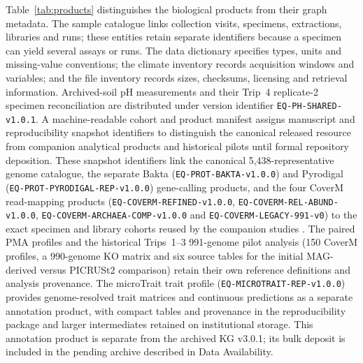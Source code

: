 \begin{revision}
Table~\ref{tab:products} distinguishes the biological products from their graph metadata.
The sample catalogue links collection visits, specimens, extractions, libraries and runs;
these entities retain separate identifiers because a specimen can yield several assays or runs.
The data dictionary specifies types, units and missing-value conventions; the climate inventory
records acquisition windows and variables; and the file inventory records sizes, checksums,
licensing and retrieval information. Archived-soil pH measurements and their Trip~4 replicate-2
specimen reconciliation are distributed under version identifier \texttt{EQ-PH-SHARED-v1.0.1}.
A machine-readable cohort and product manifest assigns manuscript and reproducibility snapshot
identifiers to distinguish the canonical released resource from companion analytical products
and historical pilots until formal repository deposition. These snapshot identifiers link the
canonical 5,438-representative genome catalogue, the separate Bakta
(\texttt{EQ-PROT-BAKTA-v1.0.0}) and Pyrodigal (\texttt{EQ-PROT-PYRODIGAL-REP-v1.0.0})
gene-calling products, and the four CoverM read-mapping products
(\texttt{EQ-COVERM-REFINED-v1.0.0}, \texttt{EQ-COVERM-REL-ABUND-v1.0.0},
\texttt{EQ-COVERM-ARCHAEA-COMP-v1.0.0} and \texttt{EQ-COVERM-LEGACY-991-v0}) to the exact
specimen and library cohorts reused by the companion studies
\cite{ecology_companion,proteome_companion}. The paired PMA profiles and the historical
Trips~1--3 991-genome pilot analysis (150 CoverM profiles, a 990-genome KO matrix and
six source tables for the initial MAG-derived versus PICRUSt2 comparison) retain their own
reference definitions and analysis provenance.
The microTrait trait profile (\texttt{EQ-MICROTRAIT-\allowbreak REP-\allowbreak v1.0.0}) provides genome-resolved trait matrices and continuous predictions as a separate annotation product, with compact tables and provenance in the reproducibility package and larger intermediates retained on institutional storage. This annotation product is separate from the archived KG v3.0.1; its bulk deposit is included in the pending archive described in Data Availability.


\end{revision}
